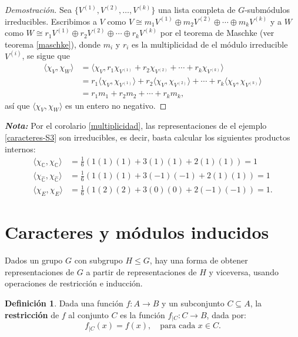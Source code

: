 \documentclass[12pt]{book}
\theoremstyle{definition}
\newtheorem{definition}[theorem]{Definición}
\newcounter{in}
\newcounter{ini}
\begin{document}
\begin{proof}[Demostración]
  Sea $\{V^{(1)},V^{(2)},\ldots,V^{(k)}\}$ una lista completa de $G$-submódulos
  irreducibles. Escribimos a $V$ como $V\cong
  m_{1}V^{(1)}\oplus m_{2}V^{(2)}\oplus\cdots\oplus m_{k}V^{(k)}$ y a $W$ como $W\cong
  r_{1}V^{(1)}\oplus r_{2}V^{(2)}\oplus\cdots\oplus r_{k}V^{(k)}$ por el
  teorema de Maschke (ver teorema \ref{maschke}), donde $m_{i}$ y $r_{i}$ es la multiplicidad de el módulo
  irreducible $V^{(i)}$, se sigue que
  \begin{align*}
    \langle\chi_{V},\chi_{W}\rangle&=\langle\chi_{V},r_{1}\chi_{V^{(1)}}+r_{2}\chi_{V^{(2)}}+\cdots+r_{k}\chi_{V^{(k)}}\rangle\\
    &=r_{1}\langle\chi_{V},\chi_{V^{(1)}}\rangle+r_{2}\langle\chi_{V},\chi_{V^{(2)}}\rangle+\cdots+r_{k}\langle\chi_{V},\chi_{V^{(k)}}\rangle\\
    &=r_{1}m_{1}+r_{2}m_{2}+\cdots+r_{k}m_{k},
  \end{align*}
  así que  $\langle\chi_{V},\chi_{W}\rangle$ es un entero no
  negativo. 
\end{proof}
\textbf{\emph{Nota:}} Por el corolario \ref{multiplicidad}, las 
representaciones de el ejemplo \ref{caracteres-S3} son irreducibles,
es decir, basta calcular los siguientes productos internos:
\begin{align*}
  \langle\chi_{\mathbb{C}},\chi_{\mathbb{C}}\rangle&=\frac{1}{6}(1(1)(1)+3(1)(1)+2(1)(1))=1  \\
  \langle\chi_{\widehat{\mathbb{C}}},\chi_{\widehat{\mathbb{C}}}\rangle&=\frac{1}{6}(1(1)(1)+3(-1)(-1)+2(1)(1))=1  \\
  \langle\chi_{E},\chi_{E}\rangle&=\frac{1}{6}(1(2)(2)+3(0)(0)+2(-1)(-1))=1.
\end{align*}

\section{Caracteres y módulos inducidos}
\label{carac-induc}

Dados un grupo $G$ con subgrupo $H\leq G$, hay una forma de obtener
representaciones de $G$ a partir de representaciones de $H$ y
viceversa, usando operaciones de
restricción e inducción.

\begin{definition}
  Dada una función $f:A\rightarrow B$ y un subconjunto $C\subseteq A$,
  la \textbf{restricción} de $f$ al conjunto $C$ es la función
  $f_{|C}:C\rightarrow B$, dada por: 
  \begin{equation*}
    \label{eq:restriccion}
    f_{|C}(x)=f(x), \quad\mbox{para cada } x \in C.
  \end{equation*}
\end{definition}
\end{document}
